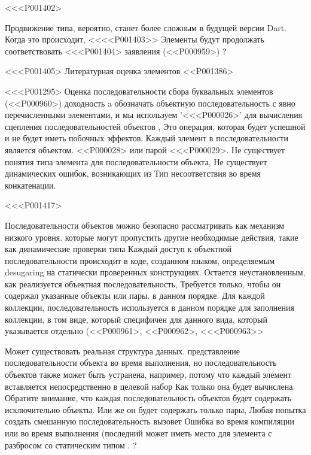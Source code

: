 <<<P001402>{%
Продвижение типа, вероятно, станет более сложным в будущей версии Dart.
Когда это происходит,
<<<<P001403>> Элементы будут продолжать соответствовать <<<P001404> заявления
(<<P000959>)%
?


<<<P001405> Литературная оценка элементов
<<P001386>

<<<P001295>%
Оценка последовательности сбора буквальных элементов
(<<P000960>)
доходность a
обозначать объектную последовательность с явно перечисленными элементами,
и мы используем '<<<P000026>' для вычисления сцепления последовательностей объектов
,
Это операция, которая будет успешной и не будет иметь побочных эффектов.
Каждый элемент в последовательности является объектом. <<P000028> или парой <<<P000029>.
Не существует понятия типа элемента для последовательности объекта,
Не существует динамических ошибок, возникающих из
Тип несоответствия во время конкатенации.

<<<P001417>{%
Последовательности объектов можно безопасно рассматривать как механизм низкого уровня.
которые могут пропустить другие необходимые действия, такие как динамические проверки типа
Каждый доступ к объектной последовательности происходит
в коде, созданном языком, определяемым desugaring
на статически проверенных конструкциях.
Остается неустановленным, как реализуется объектная последовательность,
Требуется только, чтобы он содержал указанные объекты или пары.
в данном порядке.
Для каждой коллекции,
последовательность используется в данном порядке для заполнения коллекции,
в том виде, который специфичен для данного вида,
который указывается отдельно
(<<P000961>, <<P000962>, <<<P000963>>%

Может существовать реальная структура данных.
представление последовательности объекта во время выполнения,
но последовательность объектов также может быть устранена, например,
потому что каждый элемент вставляется непосредственно в целевой набор
Как только она будет вычислена.
Обратите внимание, что каждая последовательность объектов будет содержать исключительно объекты.
Или же он будет содержать только пары,
Любая попытка создать смешанную последовательность вызовет
Ошибка во время компиляции или во время выполнения
(последний может иметь место для элемента с разбросом со статическим типом \DYNAMIC{}.%
?

}}
